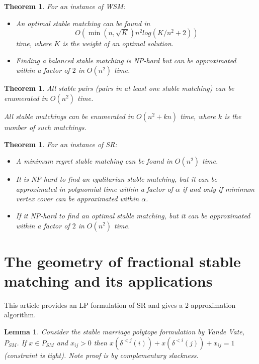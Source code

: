 \documentclass{article}
\newtheorem{lemma}[fact]{Lemma}
\newtheorem{theorem}[fact]{Theorem}
\begin{document}
\begin{theorem}
For an instance of WSM:
\begin{itemize}
\item An optimal stable matching can be found in $$O(\min(n,\sqrt{K})n^2log(K/n^2 + 2))$$ time, where $K$ is the weight of an optimal solution.
\item Finding a balanced stable matching is NP-hard but can be approximated within a factor of $2$ in $O(n^2)$ time.
\end{itemize}
\end{theorem}
\begin{theorem}
\item All stable pairs (pairs in at least one stable matching) can be enumerated in $O(n^2)$ time.
\item All stable matchings can be enumerated in $O(n^2 + kn)$ time, where $k$ is the number of such matchings.
\end{theorem}
\begin{theorem}
For an instance of SR:
\begin{itemize}
\item A minimum regret stable matching can be found in $O(n^2)$ time.
\item It is NP-hard to find an egalitarian stable matching, but it can be approximated in polynomial time within a factor of $\alpha$ if and only if minimum vertex cover can be approximated within $\alpha$.
\item If it NP-hard to find an optimal stable matching, but it can be approximated within a factor of $2$ in $O(n^2)$ time.
\end{itemize}
\end{theorem}

\section{The geometry of fractional stable matching and its applications}
This article \cite{teo1998geometry} provides an LP formulation of SR and gives a $2$-approximation algorithm.

\begin{lemma}
Consider the stable marriage polytope formulation by Vande Vate, $P_{SM}$. If $x \in P_{SM}$ and $x_{ij} >0$ then $x(\delta^{<j}(i)) + x(\delta^{<i}(j)) + x_{ij} = 1$ (constraint is tight). Note proof is by complementary slackness.
\end{lemma}
\end{document}
